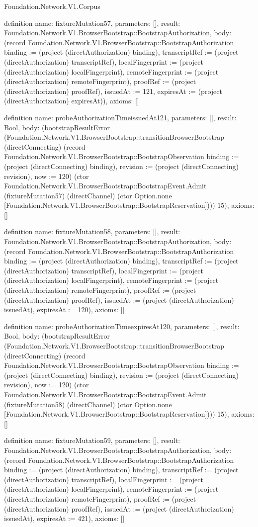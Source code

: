 \begin{lexlean}{Foundation.Network.V1.Corpus}
\begin{semanticmodule}
definition{
  name: fixtureMutation57,
  parameters: [],
  result: Foundation.Network.V1.BrowserBootstrap::BootstrapAuthorization,
  body: (record Foundation.Network.V1.BrowserBootstrap::BootstrapAuthorization {binding := (project (directAuthorization) binding), transcriptRef := (project (directAuthorization) transcriptRef), localFingerprint := (project (directAuthorization) localFingerprint), remoteFingerprint := (project (directAuthorization) remoteFingerprint), proofRef := (project (directAuthorization) proofRef), issuedAt := 121, expiresAt := (project (directAuthorization) expiresAt)}),
  axioms: []
}

definition{
  name: probeAuthorizationTimeissuedAt121,
  parameters: [],
  result: Bool,
  body: (bootstrapResultError (Foundation.Network.V1.BrowserBootstrap::transitionBrowserBootstrap (directConnecting) (record Foundation.Network.V1.BrowserBootstrap::BootstrapObservation {binding := (project (directConnecting) binding), revision := (project (directConnecting) revision), now := 120}) (ctor Foundation.Network.V1.BrowserBootstrap::BootstrapEvent.Admit (fixtureMutation57) (directChannel) (ctor Option.none [Foundation.Network.V1.BrowserBootstrap::BootstrapReservation]))) 15),
  axioms: []
}

definition{
  name: fixtureMutation58,
  parameters: [],
  result: Foundation.Network.V1.BrowserBootstrap::BootstrapAuthorization,
  body: (record Foundation.Network.V1.BrowserBootstrap::BootstrapAuthorization {binding := (project (directAuthorization) binding), transcriptRef := (project (directAuthorization) transcriptRef), localFingerprint := (project (directAuthorization) localFingerprint), remoteFingerprint := (project (directAuthorization) remoteFingerprint), proofRef := (project (directAuthorization) proofRef), issuedAt := (project (directAuthorization) issuedAt), expiresAt := 120}),
  axioms: []
}

definition{
  name: probeAuthorizationTimeexpiresAt120,
  parameters: [],
  result: Bool,
  body: (bootstrapResultError (Foundation.Network.V1.BrowserBootstrap::transitionBrowserBootstrap (directConnecting) (record Foundation.Network.V1.BrowserBootstrap::BootstrapObservation {binding := (project (directConnecting) binding), revision := (project (directConnecting) revision), now := 120}) (ctor Foundation.Network.V1.BrowserBootstrap::BootstrapEvent.Admit (fixtureMutation58) (directChannel) (ctor Option.none [Foundation.Network.V1.BrowserBootstrap::BootstrapReservation]))) 15),
  axioms: []
}

definition{
  name: fixtureMutation59,
  parameters: [],
  result: Foundation.Network.V1.BrowserBootstrap::BootstrapAuthorization,
  body: (record Foundation.Network.V1.BrowserBootstrap::BootstrapAuthorization {binding := (project (directAuthorization) binding), transcriptRef := (project (directAuthorization) transcriptRef), localFingerprint := (project (directAuthorization) localFingerprint), remoteFingerprint := (project (directAuthorization) remoteFingerprint), proofRef := (project (directAuthorization) proofRef), issuedAt := (project (directAuthorization) issuedAt), expiresAt := 421}),
  axioms: []
}


\end{semanticmodule}
\end{lexlean}
